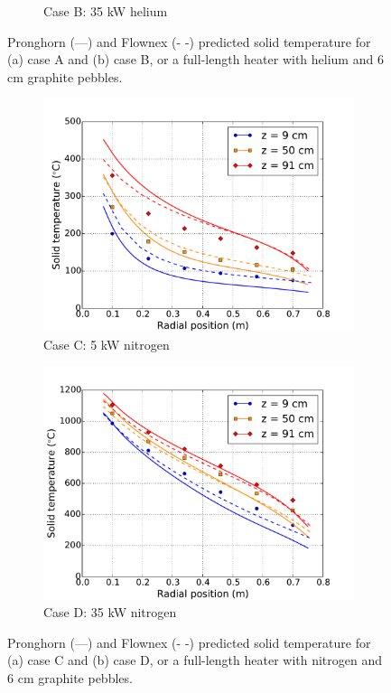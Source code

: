 \begin{figure}[h!]
\begin{subfigure}{0.5\linewidth}
        \caption{Case B: 35 \si{\kilo\watt} helium}
        \label{fig:helium_longb}
    \end{subfigure}
    \caption{Pronghorn (---) and Flownex (- -) predicted solid temperature for (a) case A and (b) case B, or a full-length heater with helium and 6 \si{\centi\meter} graphite pebbles.}
    \label{fig:helium_long}
\end{figure}

\begin{figure}[h!]
    \begin{subfigure}{0.5\linewidth}
        \centering
        \includegraphics[height=0.75\linewidth]{figs/exp_total_G.pdf}
       \caption{Case C: 5 \si{\kilo\watt} nitrogen}
       \label{fig:nitrogen_longa}
    \end{subfigure}
    \begin{subfigure}{0.5\linewidth}
        \centering
        \includegraphics[height=0.75\linewidth]{figs/exp_total_L.pdf}
        \caption{Case D: 35 \si{\kilo\watt} nitrogen}
        \label{fig:nitrogen_longb}
    \end{subfigure}
    \caption{Pronghorn (---) and Flownex (- -) predicted solid temperature for (a) case C and (b) case D, or a full-length heater with nitrogen and 6 \si{\centi\meter} graphite pebbles.}
    \label{fig:nitrogen_long}
\end{figure}

